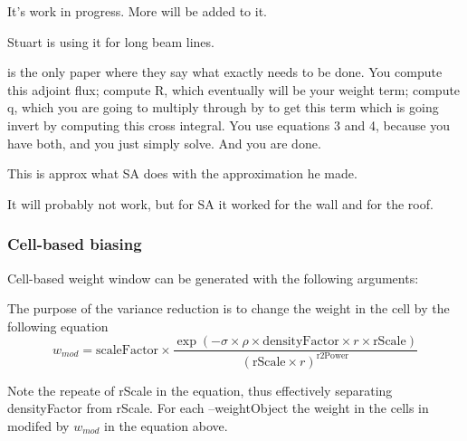 It's work in progress. More will be added to it.

Stuart is using it for long beam lines.




\cite{arXiv:1612.00793} is the only paper where they say what exactly needs to be done.
You compute this adjoint flux;
compute R, which eventually will be your weight term;
compute q, which you are going to multiply through by to get this term which is going invert by computing this cross integral.
You use equations 3 and 4, because you have both, and you just simply solve. And you are done.

This is approx what SA does with the approximation he made.

It will probably not work, but for SA it worked for the wall and for the roof.

\subsubsection{Cell-based biasing}
\label{sec:vr:cell}

Cell-based weight window can be generated with the following arguments:





  The purpose of the variance reduction is to change the weight in the cell by the following equation 
  \begin{equation}
    \label{weigthEqn}
    w_{mod}= \textrm{scaleFactor} \times \frac{\exp (-\sigma \times \rho \times \textrm{densityFactor}
      \times r \times \textrm{rScale}) }
    { (\textrm{rScale} \times r )^{\textrm{r2Power}} }
  \end{equation}

  Note the repeate of rScale in the equation, thus effectively separating densityFactor from rScale.
  For each --weightObject the weight in the cells in modifed by $w_{mod}$ in the equation above. 
  
